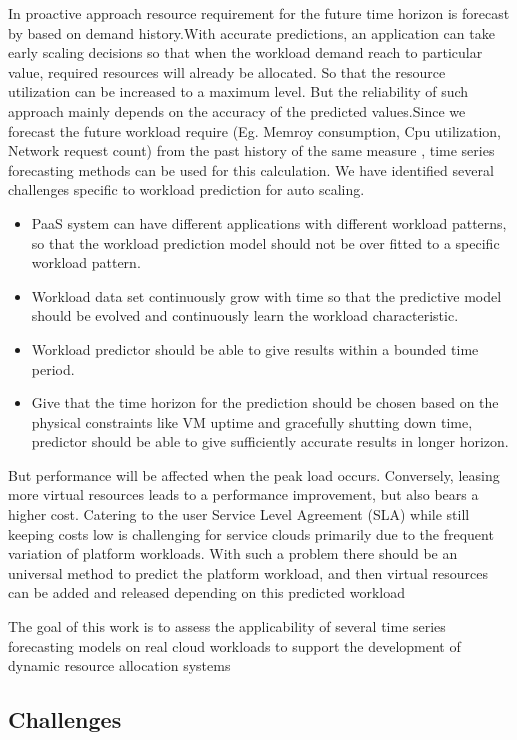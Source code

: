 In proactive approach resource requirement for the future time horizon is forecast by based on demand history.With accurate predictions, an application can take early scaling decisions so that when the workload demand reach to particular value, required resources will already be allocated. So that the resource  utilization can be increased to a maximum level. But the reliability of such approach mainly depends on the accuracy of the predicted values.Since we forecast the future workload require (Eg. Memroy consumption, Cpu utilization, Network request count) from the past history of the same measure , time series forecasting methods can be used for this calculation. 
We have identified several challenges specific to workload prediction for auto scaling.
\begin{itemize}
\item PaaS system can have different applications with different workload patterns, so that the workload prediction model should not be over fitted to a specific workload pattern.
\item Workload data set continuously grow with time so that the predictive model should be evolved and continuously learn the workload characteristic. 
\item Workload predictor should be able to give results within a bounded time period.
\item Give that the  time horizon for the prediction should be chosen based on the physical constraints like VM uptime and gracefully shutting down time, predictor should be able to give sufficiently accurate results in longer horizon.
\end{itemize}

But performance will be affected when the peak load occurs. Conversely, leasing more virtual resources leads to a performance improvement, but also bears a higher cost. Catering to the user Service Level Agreement (SLA) while still keeping costs low is challenging for service clouds primarily due to the frequent variation of
platform workloads. With such a problem there should be an universal method to predict the platform workload, and then virtual resources can be added and released depending on this predicted workload


The goal of this work is to assess the applicability of several time series forecasting models on real cloud workloads to support the development of dynamic resource allocation systems
\usepackage{multirow}

\subsection{Challenges}
